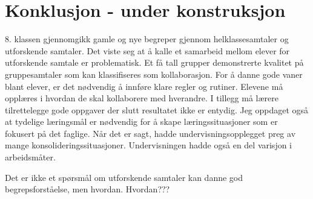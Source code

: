 \documentclass[main.tex]{subfiles}
\begin{document}
\section*{Konklusjon - under konstruksjon}
\label{sec:4}

8. klassen gjennomgikk gamle og nye begreper gjennom helklassesamtaler og utforskende 
samtaler. Det viste seg at å kalle et samarbeid mellom elever for utforskende samtale
er problematisk. Et få tall grupper demonstrerte kvalitet på gruppesamtaler som kan
klassifiseres som kollaborasjon. For å danne gode vaner blant elever, er det nødvendig 
å innføre klare regler og rutiner. Elevene må opplæres i hvordan de skal kollaborere 
med hverandre. I tillegg må lærere tilrettelegge gode oppgaver der slutt resultatet 
ikke er entydig. Jeg oppdaget også at tydelige læringsmål er nødvendig for å skape 
læringssituasjoner som er fokusert på det faglige. Når det er sagt, hadde 
undervisningsopplegget preg av mange konsolideringssituasjoner. Undervisningen hadde 
også en del varisjon i arbeidsmåter. 

Det er ikke et spørsmål om utforskende samtaler kan danne god begrepsforståelse, men 
hvordan. Hvordan???
\end{document}

